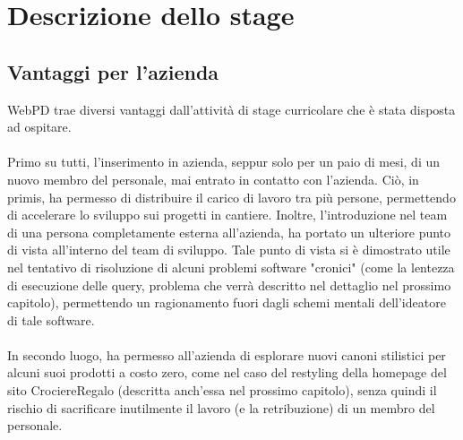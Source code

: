 
\chapter{Descrizione dello stage}
\label{cap:descrizione-stage}

\section{Vantaggi per l'azienda}
WebPD trae diversi vantaggi dall'attività di stage curricolare che è stata disposta ad ospitare.\\
\\
Primo su tutti, l'inserimento in azienda, seppur solo per un paio di mesi, di un nuovo membro del personale, mai entrato in contatto con l'azienda. Ciò, in primis, ha permesso di distribuire il carico di lavoro tra più persone, permettendo di accelerare lo sviluppo sui progetti in cantiere. Inoltre, l'introduzione nel team di una persona completamente esterna all'azienda, ha portato un ulteriore punto di vista all'interno del team di sviluppo. Tale punto di vista si è dimostrato utile nel tentativo di risoluzione di alcuni problemi software "cronici" (come la lentezza di esecuzione delle query, problema che verrà descritto nel dettaglio nel prossimo capitolo), permettendo un ragionamento fuori dagli schemi mentali dell'ideatore di tale software.\\
\\
In secondo luogo, ha permesso all'azienda di esplorare nuovi canoni stilistici per alcuni suoi prodotti a costo zero, come nel caso del restyling della homepage del sito CrociereRegalo (descritta anch'essa nel prossimo capitolo), senza quindi il rischio di sacrificare inutilmente il lavoro (e la retribuzione) di un membro del personale.